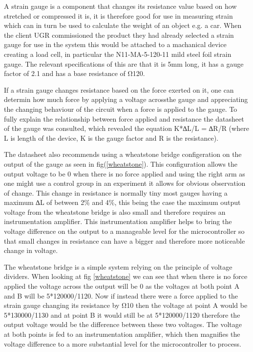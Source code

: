 A strain gauge is a component that changes its resistance value based on how stretched or compressed it is, it is therefore good for use in measuring strain which can in turn be used to calculate the weight of an object e.g. a car. When the client UGR commissioned the product they had already selected a strain gauge for use in the system this would be attached to a machanical device creating a load cell, in particular the N11-MA-5-120-11 mild steel foil strain gauge. The relevant specifications of this are that it is 5mm long, it has a gauge factor of 2.1 and has a base resistance of Ω120.

If a strain gauge changes resistance based on the force exerted on it, one can determin how much force by applying a voltage acrossthe gauge and appreciating the changing behaviour of the circuit when a force is applied to the gauge. To fully explain the relationship between force applied and resistance the datasheet of the gauge was consulted, which revealed the equation K*∆L/L = ∆R/R (where L is length of the device, K is the gauge factor and R is the resistance).  

The datasheet also recommends using a wheatstone bridge configeration on the output of the gauge as seen in fig(\ref{wheatstone}). This configuration allows the output voltage to be 0 when there is no force applied and using the right arm as one might use a control group in an experiment it allows for obvious observation of change. This change in resistance is normally tiny most gauges having a maximum ∆L of between 2\% and 4\%, this being the case the maximum output voltage from the wheatstone bridge is also small and therefore requires an instrumentation amplifier. This instrumentation amplifier helps to bring the voltage difference on the output to a manageable level for the microcontroller so that small changes in resistance can have a bigger and therefore more noticeable change in voltage. 

The wheatstone bridge is a simple system relying on the principle of voltage dividers. When looking at fig \ref{wheatstone} we can see that when there is no force applied the voltage across the output will be 0 as the voltages at both point A and B will be 5*120000/1120. Now if instead there were a force applied to the strain gauge changing its resistance by Ω10 then the voltage at point A would be 5*130000/1130 and at point B it would still be at 5*120000/1120 therefore the output voltage would be the difference between these two voltages. The voltage at both points is fed to an instrumentation amplifier, which then magnifies the voltage difference to a more substantial level for the microcontroller to process. 